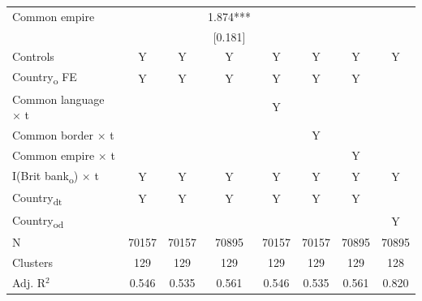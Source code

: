 {\begin{tabular}{l*{7}{c}}
Common empire&               &               &       1.874***&               &               &               &               \\
            &               &               &     [0.181]   &               &               &               &               \\
Controls    &           Y   &           Y   &           Y   &           Y   &           Y   &           Y   &           Y   \\
Country\textsubscript{o} FE&           Y   &           Y   &           Y   &           Y   &           Y   &           Y   &               \\
Common language $\times$ t&               &               &               &           Y   &               &               &               \\
Common border $\times$ t&               &               &               &               &           Y   &               &               \\
Common empire $\times$ t&               &               &               &               &               &           Y   &               \\
I(Brit bank\textsubscript{o}) $\times$ t&           Y   &           Y   &           Y   &           Y   &           Y   &           Y   &           Y   \\
Country\textsubscript{dt}&           Y   &           Y   &           Y   &           Y   &           Y   &           Y   &               \\
Country\textsubscript{od}&               &               &               &               &               &               &           Y   \\
\midrule
N           &       70157   &       70157   &       70895   &       70157   &       70157   &       70895   &       70895   \\
Clusters    &         129   &         129   &         129   &         129   &         129   &         129   &         128   \\
Adj. R{$^2$}&       0.546   &       0.535   &       0.561   &       0.546   &       0.535   &       0.561   &       0.820   \\
\bottomrule
\end{tabular}
}
